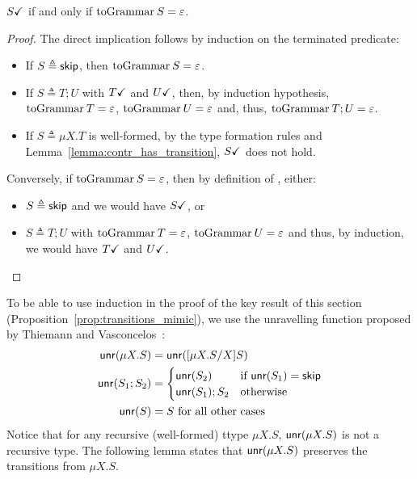 \begin{lemma}
	\label{lemma:terminated-togrammar}
	 $S\checkmark$ if and only if $\toGrammarf S = \varepsilon$.
\end{lemma}

\begin{proof}
	The direct implication follows by induction on the terminated predicate:
	\begin{itemize}
		\item If $S \triangleq \mathsf{skip}$, then $\toGrammarf{S} = \varepsilon$.
		\item If $S\triangleq T;U$ with $T\checkmark$ and $U\checkmark$, then,
		by induction hypothesis, $\toGrammarf{T} = \varepsilon$,
		$\toGrammarf{U} = \varepsilon$ and, thus, $\toGrammarf{T;U} = \varepsilon$.
		\item If $S\triangleq \mu X.T$ is well-formed, 
		by the type formation rules and 
		Lemma~\ref{lemma:contr_has_transition}, $S\checkmark$
		does not hold.
	\end{itemize}	
	Conversely, if $\toGrammarf{S} = \varepsilon$, then 
	by definition of \toGrammark, either:
	\begin{itemize}
		\item $S\triangleq \mathsf{skip}$ and we would have $S\checkmark$, or
		\item $S\triangleq T;U$ with $\toGrammarf{T} = \varepsilon$,
		$\toGrammarf{U} = \varepsilon$ and thus, by induction, we would have
		$T\checkmark$ and $U\checkmark$.
	\end{itemize}
\end{proof}

To be able to use induction in the proof of 
the key result of this section
(Proposition~\ref{prop:transitions_mimic}), we use
the unravelling function proposed 
by Thiemann and Vasconcelos~\cite{thiemann2016context}:
\[\begin{aligned}
\mathsf{unr}(\mu X . S) &= \mathsf{unr}([{\mu X.S}/{X}] S)\\
\mathsf{unr}(S_1;S_2) &= 
\begin{cases}
	\mathsf{unr}(S_2) & \text{if }\mathsf{unr}(S_1)=\mathsf{skip}\\
	\mathsf{unr}(S_1);S_2 & \text{otherwise}\\
\end{cases} \\
\mathsf{unr}(S)&= S \text{  for all other cases}
\end{aligned}\]
%
Notice that for any recursive (well-formed) ttype 
$\mu X.S$, $\mathsf{unr}(\mu X.S)$ is not a recursive type.
The following lemma states that $\mathsf{unr}(\mu X.S)$ preserves 
the transitions from $\mu X.S$.

